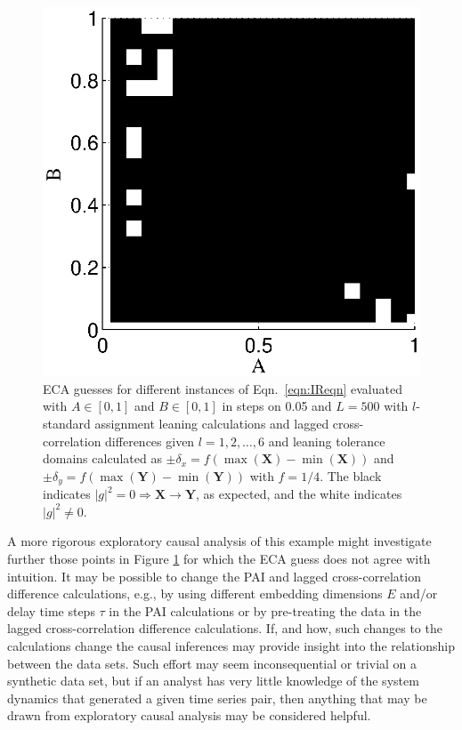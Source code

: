 \documentclass{article}[10pt]
\begin{document}
\begin{figure}[ht]
\begin{center}
\includegraphics[scale=0.8]{NoisyResponseExample_ECAguessMat.eps} 
\end{center}
\caption{ECA guesses for different instances of Eqn.\ \ref{eqn:IReqn} evaluated with $A\in[0,1]$ and $B\in[0,1]$ in steps on 0.05 and $L=500$ with $l$-standard assignment leaning calculations and lagged cross-correlation differences given $l=1,2,\ldots,6$ and leaning tolerance domains calculated as $\pm\delta_x=f(\max(\mathbf{X})-\min(\mathbf{X}))$ and $\pm\delta_y=f(\max(\mathbf{Y})-\min(\mathbf{Y}))$ with $f=1/4$.  The black indicates $|g|^2=0\Rightarrow\mathbf{X}\rightarrow\mathbf{Y}$, as expected, and the white indicates $|g|^2 \neq 0$.}
\label{fig:IRxyECAguess}
\end{figure}

A more rigorous exploratory causal analysis of this example might investigate further those points in Figure \ref{fig:IRxyECAguess} for which the ECA guess does not agree with intuition.  It may be possible to change the PAI and lagged cross-correlation difference calculations, e.g., by using different embedding dimensions $E$ and/or delay time steps $\tau$ in the PAI calculations or by pre-treating the data in the lagged cross-correlation difference calculations.  If, and how, such changes to the calculations change the causal inferences may provide insight into the relationship between the data sets.  Such effort may seem inconsequential or trivial on a synthetic data set, but if an analyst has very little knowledge of the system dynamics that generated a given time series pair, then anything that may be drawn from exploratory causal analysis may be considered helpful.  
\end{document}
